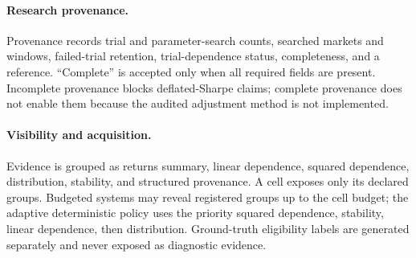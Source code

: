 \paragraph{Research provenance.}
Provenance records trial and parameter-search counts, searched markets and
windows, failed-trial retention, trial-dependence status, completeness, and a
reference.  ``Complete'' is accepted only when all required fields are
present.  Incomplete provenance blocks deflated-Sharpe claims; complete
provenance does not enable them because the audited adjustment method is not
implemented.

\paragraph{Visibility and acquisition.}
Evidence is grouped as returns summary, linear dependence, squared dependence,
distribution, stability, and structured provenance.  A cell exposes only its
declared groups.  Budgeted systems may reveal registered groups up to the cell
budget; the adaptive deterministic policy uses the priority squared
dependence, stability, linear dependence, then distribution.  Ground-truth
eligibility labels are generated separately and never exposed as diagnostic
evidence.

